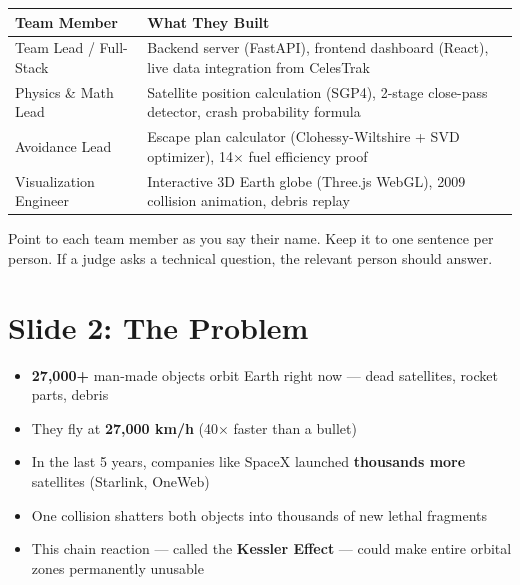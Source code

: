 \documentclass[11pt,a4paper]{article}
\begin{document}
\begin{tcolorbox}[colback=lightgray, colframe=gray!40, left=6pt, right=6pt]
\begin{tabular}{@{}p{3.8cm}p{10cm}@{}}
\toprule
\textbf{Team Member} & \textbf{What They Built} \\ \midrule
Team Lead / Full-Stack & Backend server (FastAPI), frontend dashboard (React), live data integration from CelesTrak \\[4pt]
Physics \& Math Lead & Satellite position calculation (SGP4), 2-stage close-pass detector, crash probability formula \\[4pt]
Avoidance Lead & Escape plan calculator (Clohessy-Wiltshire + SVD optimizer), 14$\times$ fuel efficiency proof \\[4pt]
Visualization Engineer & Interactive 3D Earth globe (Three.js WebGL), 2009 collision animation, debris replay \\
\bottomrule
\end{tabular}
\end{tcolorbox}

\begin{presenterbox}
Point to each team member as you say their name. Keep it to one sentence per person. If a judge asks a technical question, the relevant person should answer.
\end{presenterbox}

\newpage
\section{Slide 2: The Problem}

\begin{tcolorbox}[colback=darkbg, colframe=gray!50, coltext=white,
  title=\textbf{\color{white}The Situation in Space Today}, coltitle=white, colbacktitle=gray!30!black]
\begin{itemize}[leftmargin=1.2em, itemsep=2pt]
  \item \textbf{27,000+} man-made objects orbit Earth right now --- dead satellites, rocket parts, debris
  \item They fly at \textbf{27,000 km/h} (40$\times$ faster than a bullet)
  \item In the last 5 years, companies like SpaceX launched \textbf{thousands more} satellites (Starlink, OneWeb)
  \item One collision shatters both objects into thousands of new lethal fragments
  \item This chain reaction --- called the \textbf{Kessler Effect} --- could make entire orbital zones permanently unusable
\end{itemize}
\end{tcolorbox}
\end{document}
